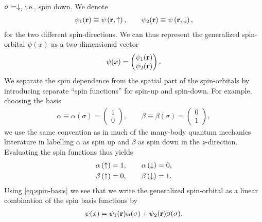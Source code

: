         $\sigma = \downarrow$, i.e., spin down.
        We denote
        \begin{align}
            \psi_1(\mathbf{r}) \equiv \psi\left( \mathbf{r}, \uparrow \right),
            \qquad
            \psi_2(\mathbf{r}) \equiv \psi\left( \mathbf{r}, \downarrow \right),
        \end{align}
        for the two different spin-directions.
        We can thus represent the generalized spin-orbital $\psi(x)$ as a
        two-dimensional vector
        \begin{align}
            \psi(x) = \begin{pmatrix}
                \psi_1(\mathbf{r}) \\
                \psi_2(\mathbf{r})
            \end{pmatrix}.
        \end{align}
        We separate the spin dependence from the spatial part of the
        spin-orbitals by introducing separate ``spin functions'' for spin-up and
        spin-down.
        For example, choosing the basis
        \begin{align}
            \alpha \equiv \alpha(\sigma) = \begin{pmatrix}
                1 \\
                0
            \end{pmatrix},
            \qquad
            \beta \equiv \beta(\sigma) = \begin{pmatrix}
                0 \\
                1
            \end{pmatrix},
            \label{eq:spin-basis}
        \end{align}
        we use the same convention as in much of the many-body quantum mechanics
        litterature in labelling $\alpha$ as spin up and $\beta$ as spin down in
        the $z$-direction.
        Evaluating the spin functions thus yields
        \begin{gather}
            \alpha\left( \uparrow \right) = 1, \qquad \alpha\left( \downarrow \right) = 0, \\
            \beta\left( \uparrow \right) = 0, \qquad \beta\left( \downarrow \right) = 1.
        \end{gather}
        Using \autoref{eq:spin-basis} we see that we write the
        generalized spin-orbital as a linear combination of the spin basis
        functions by
        \begin{align}
            \psi(x)
            = \psi_1(\mathbf{r})\alpha(\sigma)
            + \psi_2(\mathbf{r})\beta(\sigma).
            \label{eq:general-spin-orbital}
        \end{align}

